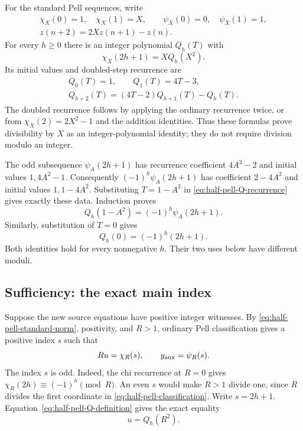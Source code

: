For the standard Pell sequences, write
\[
 \begin{gathered}
 \chi_X(0)=1,\quad\chi_X(1)=X,\qquad
 \psi_X(0)=0,\quad\psi_X(1)=1,\\
 z(n+2)=2Xz(n+1)-z(n).
 \end{gathered}
\]
For every $h\ge0$ there is an integer polynomial $Q_h(T)$ with
\begin{equation}\label{eq:half-pell-Q-definition}
 \chi_X(2h+1)=XQ_h(X^2).
\end{equation}
Its initial values and doubled-step recurrence are
\begin{equation}\label{eq:half-pell-Q-recurrence}
 \begin{gathered}
 Q_0(T)=1,\qquad Q_1(T)=4T-3,\\
 Q_{h+2}(T)=(4T-2)Q_{h+1}(T)-Q_h(T).
 \end{gathered}
\end{equation}
The doubled recurrence follows by applying the ordinary recurrence
twice, or from $\chi_X(2)=2X^2-1$ and the addition identities.
Thus these formulas prove divisibility by $X$ as an integer-polynomial
identity; they do not require division modulo an integer.

The odd subsequence $\psi_A(2h+1)$ has recurrence coefficient
$4A^2-2$ and initial values $1,4A^2-1$. Consequently
$(-1)^h\psi_A(2h+1)$ has coefficient $2-4A^2$ and initial
values $1,1-4A^2$. Substituting $T=1-A^2$ in
\eqref{eq:half-pell-Q-recurrence} gives exactly these data.
Induction proves
\begin{equation}\label{eq:half-pell-Q-complement}
 Q_h(1-A^2)=(-1)^h\psi_A(2h+1).
\end{equation}
Similarly, substitution of $T=0$ gives
\begin{equation}\label{eq:half-pell-Q-zero}
 Q_h(0)=(-1)^h(2h+1).
\end{equation}
Both identities hold for every nonnegative $h$. Their two uses below
have different moduli.

\subsection{Sufficiency: the exact main index}

Suppose the new source equations have positive integer witnesses.
By \eqref{eq:half-pell-standard-norm}, positivity, and $R>1$,
ordinary Pell classification gives a positive index $s$ such that
\begin{equation}\label{eq:half-pell-classification}
 Ru=\chi_R(s),\qquad y_{\rm aux}=\psi_R(s).
\end{equation}
The index $s$ is odd. Indeed, the chi recurrence at $R=0$ gives
$\chi_R(2h)\equiv(-1)^h\pmod R$. An even $s$ would make
$R>1$ divide one, since $R$ divides the first coordinate in
\eqref{eq:half-pell-classification}. Write $s=2h+1$.
Equation~\eqref{eq:half-pell-Q-definition} gives the exact equality
\begin{equation}\label{eq:half-pell-u-polynomial}
 u=Q_h(R^2).
\end{equation}

